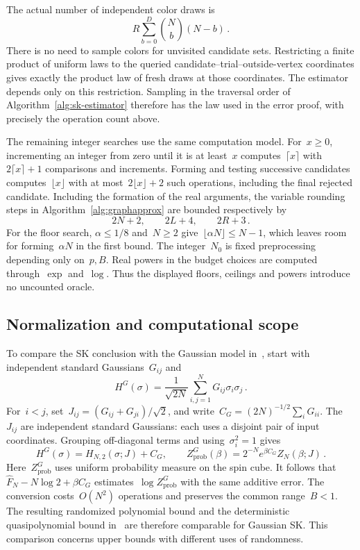 \documentclass[10pt]{article}
\theoremstyle{plain}
\theoremstyle{definition}
\theoremstyle{remark}
\begin{document}
The actual number of independent color draws is
\begin{equation*}
 R\sum_{b=0}^{D}\binom Nb(N-b)\,.
\end{equation*}
There is no need to sample colors for unvisited candidate sets. Restricting a finite product of uniform laws to the queried candidate--trial--outside-vertex coordinates gives exactly the product law of fresh draws at those coordinates. The estimator depends only on this restriction. Sampling in the traversal order of Algorithm~\ref{alg:sk-estimator} therefore has the law used in the error proof, with precisely the operation count above.

\label{app:rounding}
The remaining integer searches use the same computation model. For~$x\ge0$, incrementing an integer from zero until it is at least~$x$ computes~$\lceil x\rceil$ with~$2\lceil x\rceil+1$ comparisons and increments. Forming and testing successive candidates computes~$\lfloor x\rfloor$ with at most~$2\lfloor x\rfloor+2$ such operations, including the final rejected candidate. Including the formation of the real arguments, the variable rounding steps in Algorithm~\ref{alg:graphapprox} are bounded respectively by
\begin{equation*}
 2N+2,\qquad 2L+4,\qquad 2R+3\,.
\end{equation*}
For the floor search, $\alpha\le1/8$ and~$N\ge2$ give~$\lfloor\alpha N\rfloor\le N-1$, which leaves room for forming~$\alpha N$ in the first bound. The integer~$N_0$ is fixed preprocessing depending only on~$p,B$. Real powers in the budget choices are computed through~$\exp$ and~$\log$. Thus the displayed floors, ceilings and powers introduce no uncounted oracle.

\subsection{Normalization and computational scope}\label{app:normalization}
To compare the SK conclusion with the Gaussian model in~\cite{BHL+25}, start with independent standard Gaussians~$G_{ij}$ and
\begin{equation*}
 H^G(\sigma)=\frac1{\sqrt{2N}}\sum_{i,j=1}^NG_{ij}\sigma_i\sigma_j\,.
\end{equation*}
For~$i<j$, set~$J_{ij}=(G_{ij}+G_{ji})/\sqrt2$, and write~$C_G=(2N)^{-1/2}\sum_iG_{ii}$. The~$J_{ij}$ are independent standard Gaussians: each uses a disjoint pair of input coordinates. Grouping off-diagonal terms and using~$\sigma_i^2=1$ gives
\begin{equation}\label{eq:gaussian-normalization}
 H^G(\sigma)=H_{N,2}(\sigma;J)+C_G,\qquad
 Z^G_{\mathrm{prob}}(\beta)=2^{-N}e^{\beta C_G}Z_N(\beta;J)\,.
\end{equation}
Here~$Z^G_{\mathrm{prob}}$ uses uniform probability measure on the spin cube. It follows that~$\widehat F_N-N\log2+\beta C_G$ estimates~$\log Z^G_{\mathrm{prob}}$ with the same additive error. The conversion costs~$O(N^2)$ operations and preserves the common range~$B<1$. The resulting randomized polynomial bound and the deterministic quasipolynomial bound in~\cite[Theorem~1.1]{BHL+25} are therefore comparable for Gaussian SK. This comparison concerns upper bounds with different uses of randomness.
\end{document}
